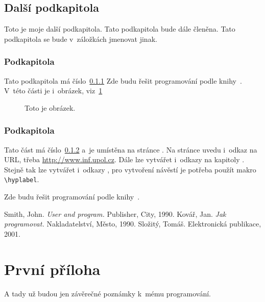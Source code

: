 \documentclass[11pt]{article}
\begin{document}
\subsection{Další podkapitola}
Toto je moje další podkapitola. Tato podkapitola bude dále členěna.
Tato podkapitola se bude v~záložkách jmenovat jinak.

\subsubsection{Podkapitola}\label{podkapX}
Tato podkapitola má číslo~\ref{podkapX}
Zde budu řešit programování podle knihy~\cite{kovar}.
V~této části je i~obrázek, viz~\ref{obr}

\begin{figure}[ht]
  \centerline{}
  \caption{Toto je obrázek.} \label{obr}
\end{figure}

\subsubsection{Podkapitola}\label{podkapY}
Tato část má číslo~\ref{podkapY} a~je umístěna na stránce \pageref{podkapY}.
Na stránce uvedu i~odkaz na URL, třeba \url{http://www.inf.upol.cz}.
Dále lze vytvářet i~odkazy na kapitoly .
Stejně tak lze vytvářet i~odkazy ,
pro vytvoření návěstí je potřeba použít makro \verb|\hyplabel|.

\medskip
Zde budu řešit programování podle knihy~\cite{kovar}.


\newpage
\begin{thebibliography}{99}

 Smith, John. \emph{User and program.}
                Publisher, City, 1990.
 Kovář, Jan. \emph{Jak programovat.}
                Nakladatelství, Město, 1990.
 Složitý, Tomáš. 
                Elektronická publikace, 2001.

\end{thebibliography}


\newpage
\appendix

\section{První příloha} \label{PrvniPriloha}
A tady už budou jen závěrečné poznámky k~mému programování.
\end{document}
